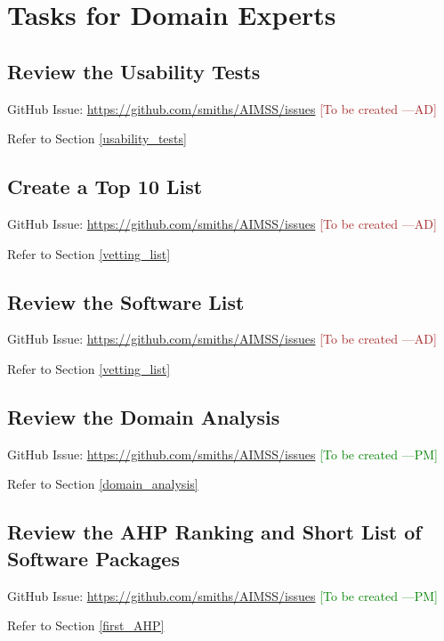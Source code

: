 \documentclass[12pt]{article}
\newcommand{\authornote}[3]{\textcolor{#1}{[#3 ---#2]}}
\newcommand{\authornote}[3]{}
\newcommand{\pmi}[1]{\authornote{green}{PM}{#1}} %
\newcommand{\ad}[1]{\authornote{brown}{AD}{#1}} %
\begin{document}
\newpage

\section{Tasks for Domain Experts}
\label{tasks_domain_experts}

\subsection{Review the Usability Tests}
\label{task_usability_tests}
GitHub Issue:
\href{https://github.com/smiths/AIMSS/issues}{https://github.com/smiths/AIMSS/issues}
\ad{To be created}

\noindent Refer to Section \ref{usability_tests}

\subsection{Create a Top 10 List}
\label{task_top_10_list}
GitHub Issue:
\href{https://github.com/smiths/AIMSS/issues}{https://github.com/smiths/AIMSS/issues}
\ad{To be created}

\noindent Refer to Section \ref{vetting_list}

\subsection{Review the Software List}
\label{task_software_list}
GitHub Issue:
\href{https://github.com/smiths/AIMSS/issues}{https://github.com/smiths/AIMSS/issues}
\ad{To be created}

\noindent Refer to Section \ref{vetting_list}

\subsection{Review the Domain Analysis}
GitHub Issue:
\href{https://github.com/smiths/AIMSS/issues}{https://github.com/smiths/AIMSS/issues}
\pmi{To be created}

\noindent Refer to Section \ref{domain_analysis}

\subsection{Review the AHP Ranking and Short List of Software Packages}
GitHub Issue:
\href{https://github.com/smiths/AIMSS/issues}{https://github.com/smiths/AIMSS/issues}
\pmi{To be created}

\noindent Refer to Section \ref{first_AHP}
\end{document}
